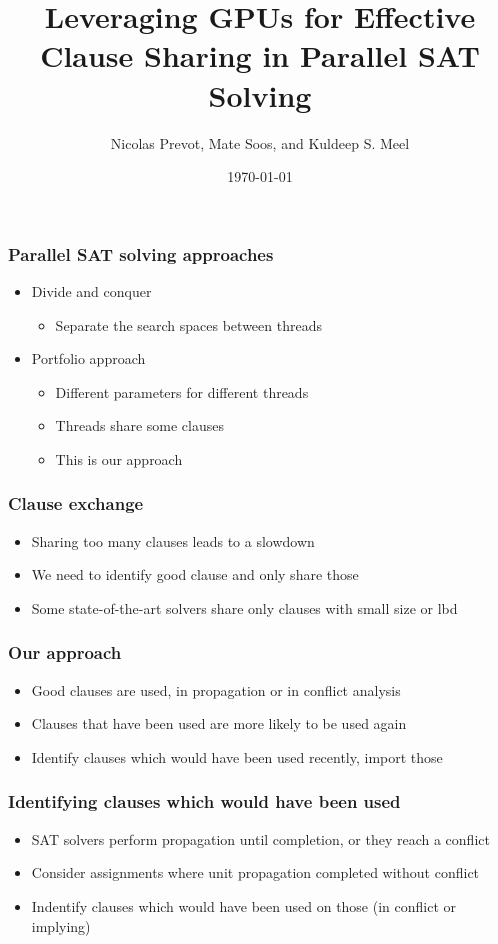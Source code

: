 \documentclass{beamer}
\title{Leveraging GPUs for Effective Clause Sharing in Parallel SAT Solving}
\author{Nicolas Prevot, Mate Soos, and Kuldeep S. Meel}
\date{\today}
\begin{document}
\begin{frame}
\titlepage
\end{frame}

\begin{frame}
\frametitle{Parallel SAT solving approaches}
\begin{itemize}
\item Divide and conquer
\begin{itemize}
\item Separate the search spaces between threads
\end{itemize}
\item Portfolio approach
\begin{itemize}
\item Different parameters for different threads
\item Threads share some clauses
\item This is our approach
\end{itemize}
\end{itemize}
\end{frame}

\begin{frame}
\frametitle{Clause exchange}
\begin{itemize}
\item Sharing too many clauses leads to a slowdown
\item We need to identify good clause and only share those
\item Some state-of-the-art solvers share only clauses with small size or lbd
\end{itemize}
\end{frame}

\begin{frame}
\frametitle{Our approach}
\begin{itemize}
\item Good clauses are used, in propagation or in conflict analysis
\item Clauses that have been used are more likely to be used again
\item Identify clauses which would have been used recently, import those
\end{itemize}
\end{frame}

\begin{frame}
\frametitle{Identifying clauses which would have been used}
\begin{itemize}
\item SAT solvers perform propagation until completion, or they reach a conflict
\item Consider assignments where unit propagation completed without conflict
\item Indentify clauses which would have been used on those (in conflict or implying)
\end{itemize}
\end{frame}
\end{document}
